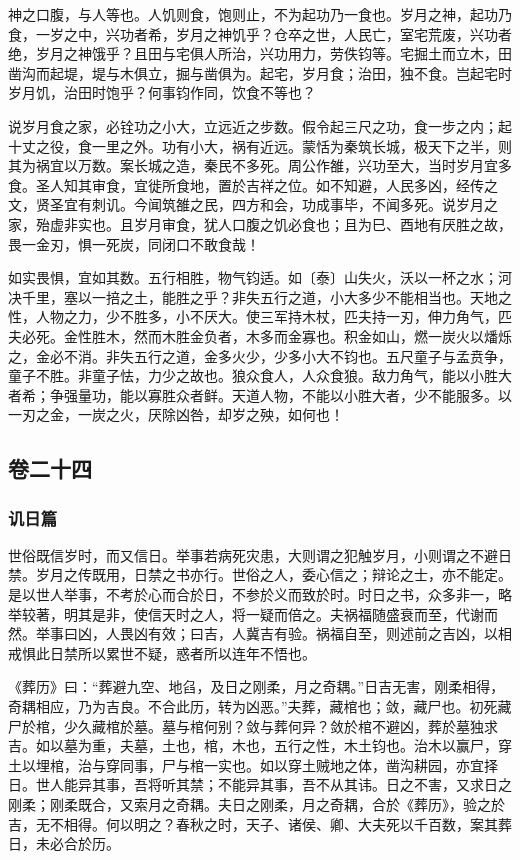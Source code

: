 \documentclass[]{article}
\begin{document}
神之口腹，与人等也。人饥则食，饱则止，不为起功乃一食也。岁月之神，起功乃食，一岁之中，兴功者希，岁月之神饥乎？仓卒之世，人民亡，室宅荒废，兴功者绝，岁月之神饿乎？且田与宅俱人所治，兴功用力，劳佚钧等。宅掘土而立木，田凿沟而起堤，堤与木俱立，掘与凿俱为。起宅，岁月食；治田，独不食。岂起宅时岁月饥，治田时饱乎？何事钧作同，饮食不等也？

说岁月食之家，必铨功之小大，立远近之步数。假令起三尺之功，食一步之内；起十丈之役，食一里之外。功有小大，祸有近远。蒙恬为秦筑长城，极天下之半，则其为祸宜以万数。案长城之造，秦民不多死。周公作雒，兴功至大，当时岁月宜多食。圣人知其审食，宜徙所食地，置於吉祥之位。如不知避，人民多凶，经传之文，贤圣宜有刺讥。今闻筑雒之民，四方和会，功成事毕，不闻多死。说岁月之家，殆虚非实也。且岁月审食，犹人口腹之饥必食也；且为巳、酉地有厌胜之故，畏一金刃，惧一死炭，同闭口不敢食哉！

如实畏惧，宜如其数。五行相胜，物气钧适。如〔泰〕山失火，沃以一杯之水；河决千里，塞以一掊之土，能胜之乎？非失五行之道，小大多少不能相当也。天地之性，人物之力，少不胜多，小不厌大。使三军持木杖，匹夫持一刃，伸力角气，匹夫必死。金性胜木，然而木胜金负者，木多而金寡也。积金如山，燃一炭火以燔烁之，金必不消。非失五行之道，金多火少，少多小大不钧也。五尺童子与孟贲争，童子不胜。非童子怯，力少之故也。狼众食人，人众食狼。敌力角气，能以小胜大者希；争强量功，能以寡胜众者鲜。天道人物，不能以小胜大者，少不能服多。以一刃之金，一炭之火，厌除凶咎，却岁之殃，如何也！

\hypertarget{header-n837}{%
\subsection{卷二十四}\label{header-n837}}

\hypertarget{header-n838}{%
\subsubsection{讥日篇}\label{header-n838}}

世俗既信岁时，而又信日。举事若病死灾患，大则谓之犯触岁月，小则谓之不避日禁。岁月之传既用，日禁之书亦行。世俗之人，委心信之；辩论之士，亦不能定。是以世人举事，不考於心而合於日，不参於义而致於时。时日之书，众多非一，略举较著，明其是非，使信天时之人，将一疑而倍之。夫祸福随盛衰而至，代谢而然。举事曰凶，人畏凶有效；曰吉，人冀吉有验。祸福自至，则述前之吉凶，以相戒惧此日禁所以累世不疑，惑者所以连年不悟也。

《葬历》曰：``葬避九空、地臽，及日之刚柔，月之奇耦。''日吉无害，刚柔相得，奇耦相应，乃为吉良。不合此历，转为凶恶。''夫葬，藏棺也；敛，藏尸也。初死藏尸於棺，少久藏棺於墓。墓与棺何别？敛与葬何异？敛於棺不避凶，葬於墓独求吉。如以墓为重，夫墓，土也，棺，木也，五行之性，木土钧也。治木以赢尸，穿土以埋棺，治与穿同事，尸与棺一实也。如以穿土贼地之体，凿沟耕园，亦宜择日。世人能异其事，吾将听其禁；不能异其事，吾不从其讳。日之不害，又求日之刚柔；刚柔既合，又索月之奇耦。夫日之刚柔，月之奇耦，合於《葬历》，验之於吉，无不相得。何以明之？春秋之时，天子、诸侯、卿、大夫死以千百数，案其葬日，未必合於历。
\end{document}
